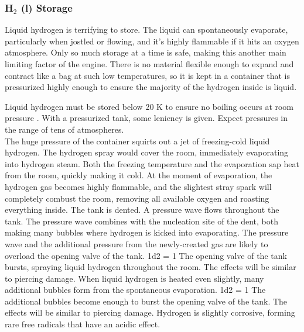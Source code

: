 \documentclass[a4paper]{article}
\begin{document}
\vspace{-0.5cm} \hspace{-18pt} \subsubsection{H$_2$ (l) Storage} \label{engine_h2_storage} \vspace{-0.2cm}
Liquid hydrogen is terrifying to store. The liquid can spontaneously evaporate, particularly when jostled or flowing, and it's highly flammable if it hits an oxygen atmosphere. Only so much storage at a time is safe, making this another main limiting factor of the engine. There is no material flexible enough to expand and contract like a bag at such low temperatures, so it is kept in a container that is pressurized highly enough to ensure the majority of the hydrogen inside is liquid.

Liquid hydrogen must be stored below 20 K to ensure no boiling occurs at room pressure \cite{international_temperature_scale_of_1968}. With a pressurized tank, some leniency is given. Expect pressures in the range of tens of atmospheres.
\\ \pbhw
{The huge pressure of the container squirts out a jet of freezing-cold liquid hydrogen. The hydrogen spray would cover the room, immediately evaporating into hydrogen steam. Both the freezing temperature and the evaporation sap heat from the room, quickly making it cold. At the moment of evaporation, the hydrogen gas becomes highly flammable, and the slightest stray spark will completely combust the room, removing all available oxygen and roasting everything inside.}
{The tank is dented. A pressure wave flows throughout the tank. The pressure wave combines with the nucleation site of the dent, both making many bubbles where hydrogen is kicked into evaporating. The pressure wave and the additional pressure from the newly-created gas are likely to overload the opening valve of the tank. \newline 1d2 = 1 The opening valve of the tank bursts, spraying liquid hydrogen throughout the room. The effects will be similar to piercing damage.}
{When liquid hydrogen is heated even slightly, many additional bubbles form from the spontaneous evaporation. \newline 1d2 = 1 The additional bubbles become enough to burst the opening valve of the tank. The effects will be similar to piercing damage.}
{Hydrogen is slightly corrosive, forming rare free radicals that have an acidic effect.}
\end{document}
